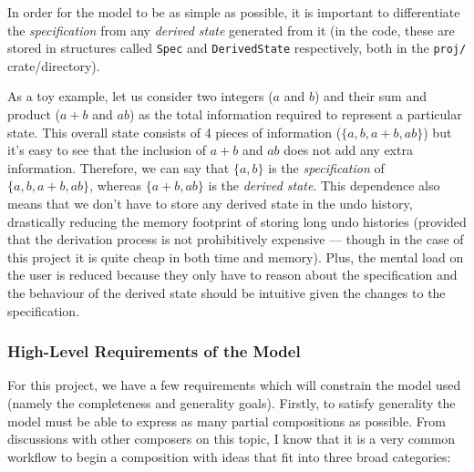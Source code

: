 \documentclass[12pt]{article}
\begin{document}
In order for the model to be as simple as possible, it is important to differentiate the
\emph{specification} from any \emph{derived state} generated from it (in the code, these are stored
in structures called \verb|Spec| and \verb|DerivedState| respectively, both in the \verb|proj/|
crate/directory).

As a toy example, let us consider two integers ($a$ and $b$) and their sum and product ($a + b$ and
$ab$) as the total information required to represent a particular state.  This overall state
consists of 4 pieces of information ($\{a, b, a + b, ab\}$) but it's easy to see that the inclusion
of $a + b$ and $ab$ does not add any extra information.  Therefore, we can say that $\{a, b\}$ is
the \emph{specification} of $\{a, b, a + b, ab\}$, whereas $\{a + b, ab\}$ is the \emph{derived
state}.  This dependence also means that we don't have to store any derived state in the undo
history, drastically reducing the memory footprint of storing long undo histories (provided that the
derivation process is not prohibitively expensive --- though in the case of this project it is quite
cheap in both time and memory).  Plus, the mental load on the user is reduced because they only have
to reason about the specification and the behaviour of the derived state should be intuitive given
the changes to the specification.

\subsubsection{High-Level Requirements of the Model}

For this project, we have a few requirements which will constrain the model used (namely the
completeness and generality goals).  Firstly, to satisfy generality the model must be able to
express as many partial compositions as possible.  From discussions with other composers on this
topic, I know that it is a very common workflow to begin a composition with ideas that fit into
three broad categories:
\end{document}
